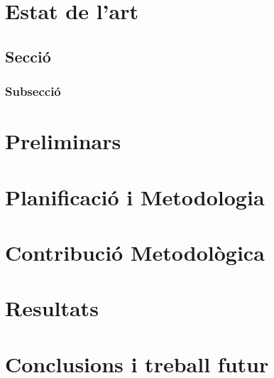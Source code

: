 \documentclass[a4paper,12pt,twoside]{ThesisStyle}
\begin{document}
\chapter{Estat de l'art}
\label{cap:estat}

\section{Secció}

\subsection{Subsecció}

\chapter{Preliminars}
\label{cap:prelim}

\chapter{Planificació i Metodologia}
\label{cap:plan}

\chapter{Contribució Metodològica}
\label{cap:contrib}

\chapter{Resultats}
\label{cap:result}

\chapter{Conclusions i treball futur}
\label{cap:concl}

\backmatter


%




\end{document}
